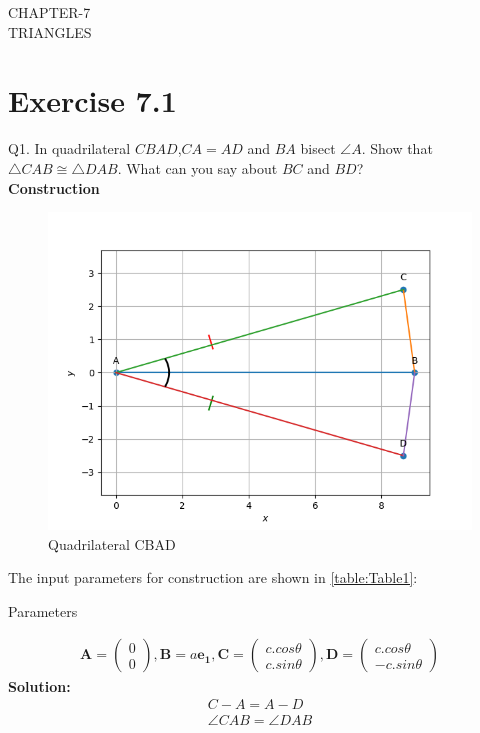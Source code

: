 \documentclass{article}
\newcommand{\solution}{\noindent \textbf{Solution: }}
\newcommand{\myvec}[1]{\ensuremath{\begin{pmatrix}#1\end{pmatrix}}}
\let\vec\mathbf
\begin{document}
\begin{center}
        \textbf\large{CHAPTER-7 \\ TRIANGLES}
\end{center}
\section{Exercise 7.1}
Q1. In quadrilateral $CBAD$,$CA = AD$ and $BA$ bisect $\angle{A}$. Show that $\triangle{CAB} \cong \triangle{DAB}$. What can you say about $BC$ and $BD$? \\
\textbf{Construction}\\
\begin{figure}[h]
	\begin{center}
		\includegraphics[width=\columnwidth]{figs/graph.png}
	\end{center}
	\caption{Quadrilateral CBAD}
	\label{figure:Fig1}
\end{figure}
The input parameters for construction are shown in \ref{table:Table1}:\\
\begin{table}[h!]
	  \centering
	  
	  \caption{Parameters}
	  \label{table:Table1}
\end{table}
\begin{align}
	\vec{A} = \myvec{0\\0},\vec{B} = a\vec{e_1},\vec{C} = \myvec{c.cos\theta\\c.sin\theta},\vec{D} = \myvec{c.cos\theta\\-c.sin\theta}
\end{align}
\solution
\begin{align}
	C-A = A-D\\
	\angle{CAB} = \angle{DAB}
\end{align}
\end{document}
